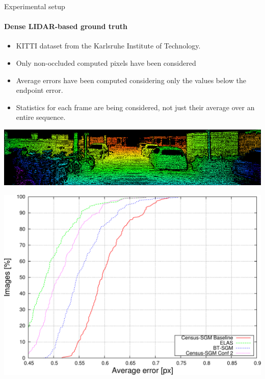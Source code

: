 \begin{frame}[plain]{Experimental setup}
  \framesubtitle{Dense LIDAR-based ground truth}
  \begin{overlayarea}{\textwidth}{\textheight}
    \begin{itemize}
      \item KITTI dataset from the Karlsruhe Institute of Technology.
      \item Only non-occluded computed pixels have been considered
      \item Average errors have been computed considering only the values below the endpoint error.
      \item Statistics for each frame are being considered, not just their average over an entire sequence.
    \end{itemize}
    
  \end{overlayarea}
  \begin{overlayarea}{\textwidth}{\textheight}
     {
      \vspace{-3.5cm}
      \includegraphics[width=\textwidth]{lidarGT}
    }
     {
      \vspace{-4.25cm}
      \begin{center}
	\includegraphics[height=0.6\textheight]{algo_avg_ee2}
      \end{center}
    }
  \end{overlayarea}


\end{frame}
